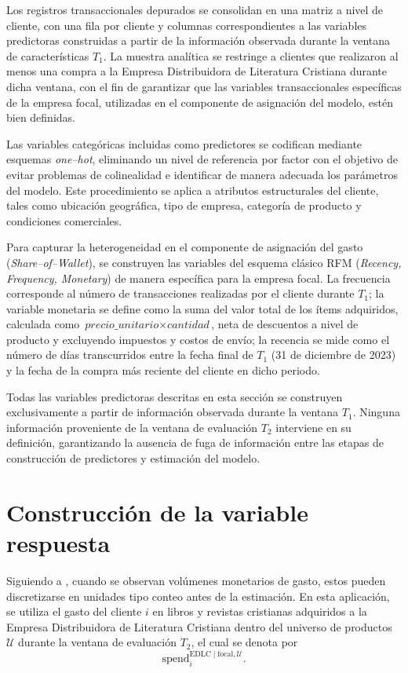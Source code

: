     Los registros transaccionales depurados se consolidan en una matriz a nivel de cliente, con una fila por cliente y columnas correspondientes a las variables predictoras construidas a partir de la información observada durante la ventana de características \(T_1\). La muestra analítica se restringe a clientes que realizaron al menos una compra a la Empresa Distribuidora de Literatura Cristiana durante dicha ventana, con el fin de garantizar que las variables transaccionales específicas de la empresa focal, utilizadas en el componente de asignación del modelo, estén bien definidas.
    
    Las variables categóricas incluidas como predictores se codifican mediante esquemas \emph{one--hot}, eliminando un nivel de referencia por factor con el objetivo de evitar problemas de colinealidad e identificar de manera adecuada los parámetros del modelo. Este procedimiento se aplica a atributos estructurales del cliente, tales como ubicación geográfica, tipo de empresa, categoría de producto y condiciones comerciales.
    
    Para capturar la heterogeneidad en el componente de asignación del gasto (\emph{Share--of--Wallet}), se construyen las variables del esquema clásico RFM (\emph{Recency, Frequency, Monetary}) de manera específica para la empresa focal. La frecuencia corresponde al número de transacciones realizadas por el cliente durante \(T_1\); la variable monetaria se define como la suma del valor total de los ítems adquiridos, calculada como \(\textit{precio\_unitario} \times \textit{cantidad}\), neta de descuentos a nivel de producto y excluyendo impuestos y costos de envío; la recencia se mide como el número de días transcurridos entre la fecha final de \(T_1\) (31 de diciembre de 2023) y la fecha de la compra más reciente del cliente en dicho periodo.
    
    Todas las variables predictoras descritas en esta sección se construyen exclusivamente a partir de información observada durante la ventana \(T_1\). Ninguna información proveniente de la ventana de evaluación \(T_2\) interviene en su definición, garantizando la ausencia de fuga de información entre las etapas de construcción de predictores y estimación del modelo.
    
\section{Construcción de la variable respuesta}
    Siguiendo a \cite{glady2009predicting}, cuando se observan volúmenes monetarios de gasto, estos pueden discretizarse en unidades tipo conteo antes de la estimación. En esta aplicación, se utiliza el gasto del cliente \(i\) en libros y revistas cristianas adquiridos a la Empresa Distribuidora de Literatura Cristiana dentro del universo de productos \(\mathcal{U}\) durante la ventana de evaluación \(T_2\), el cual se denota por
    \[
    \mathrm{spend}_{i}^{\mathrm{EDLC}\mid\mathrm{focal},\mathcal{U}}.
    \]
    

